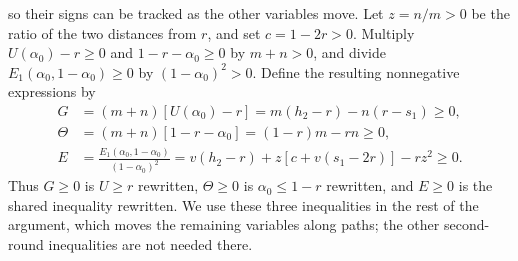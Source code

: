 \documentclass[11pt]{article}
\theoremstyle{remark}
\theoremstyle{plain}
\begin{document}
so their signs can be tracked as the other variables move.
Let $z=n/m>0$ be the ratio of the two distances from $r$, and set
$c=1-2r>0$.
Multiply $U(\alpha_0)-r\ge0$ and $1-r-\alpha_0\ge0$ by $m+n>0$,
and divide $E_1(\alpha_0,1-\alpha_0)\ge0$ by $(1-\alpha_0)^2>0$.
Define the resulting nonnegative expressions by
\begin{equation}
 \begin{aligned}
 G&=(m+n)[U(\alpha_0)-r]=m(h_2-r)-n(r-s_1)\ge0,\\
 \Theta&=(m+n)[1-r-\alpha_0]=(1-r)m-rn\ge0,\\
 E&=\frac{E_1(\alpha_0,1-\alpha_0)}{(1-\alpha_0)^2}
   =v(h_2-r)+z[c+v(s_1-2r)]-rz^2\ge0.
 \end{aligned}
 \label{eq:main-reduced-comparisons}
\end{equation}
Thus $G\ge0$ is $U\ge r$ rewritten, $\Theta\ge0$ is
$\alpha_0\le1-r$ rewritten, and $E\ge0$ is the shared inequality
rewritten. We use these three inequalities in the rest of the
argument, which moves the remaining variables along paths; the other
second-round inequalities are not needed there.
\end{document}
